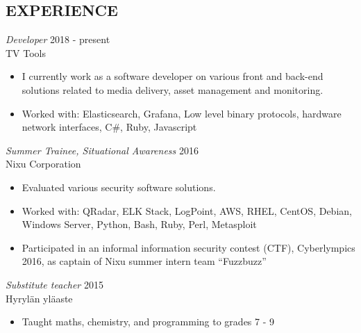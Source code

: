 \documentclass[margin, 10pt]{res} %
\begin{document}
\begin{resume}

%
%

 
\section{EXPERIENCE}

{\sl Developer} \hfill 2018 - present \\
TV Tools
\begin{itemize} \itemsep -2pt %
\item I currently work as a software developer on various front and back-end solutions related to media delivery, asset management and monitoring.
\item Worked with: Elasticsearch, Grafana, Low level binary protocols, hardware network interfaces, C\#, Ruby, Javascript
\end{itemize}

{\sl Summer Trainee, Situational Awareness} \hfill 2016\\
Nixu Corporation
\begin{itemize} \itemsep -2pt %
\item Evaluated various security software solutions.
\item Worked with: QRadar, ELK Stack, LogPoint, AWS, RHEL, CentOS, Debian, Windows Server, Python, Bash, Ruby, Perl, Metasploit
\item Participated in an informal information security contest (CTF), Cyberlympics 2016, as captain of Nixu summer intern team ``Fuzzbuzz''  
\end{itemize}

{\sl Substitute teacher} \hfill 2015\\
Hyrylän yläaste
\begin{itemize} \itemsep -2pt %
\item Taught maths, chemistry, and programming to grades 7 - 9
\end{itemize}

  


\end{resume}
\end{document}
